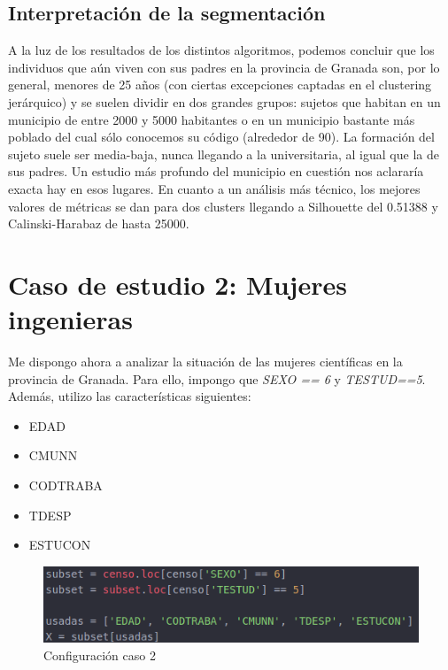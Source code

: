 \subsection{Interpretación de la segmentación}

A la luz de los resultados de los distintos algoritmos, podemos concluir que los individuos que aún viven con sus padres en la provincia de Granada son, por lo general, menores de 25 años (con ciertas excepciones captadas en el clustering jerárquico) y se suelen dividir en dos grandes grupos: sujetos que habitan en un municipio de entre 2000 y 5000 habitantes o en un municipio bastante más poblado del cual sólo conocemos su código (alrededor de 90). La formación del sujeto suele ser media-baja, nunca llegando a la universitaria, al igual que la de sus padres. Un estudio más profundo del municipio en cuestión nos aclararía exacta hay en esos lugares. En cuanto a un análisis más técnico, los mejores valores de métricas se dan para dos clusters llegando a Silhouette del 0.51388 y Calinski-Harabaz de hasta 25000.

\section{Caso de estudio 2: Mujeres ingenieras}

Me dispongo ahora a analizar la situación de las mujeres científicas en la provincia de Granada. Para ello, impongo que \textit{SEXO == 6} y \textit{TESTUD==5}. Además, utilizo las características siguientes:
\begin{itemize}
	\item EDAD
	\item CMUNN
	\item CODTRABA
	\item TDESP
	\item ESTUCON
\end{itemize}


\begin{figure}[H] %
	\centering
	\includegraphics[scale=0.7]{capt3.png}  %
	\caption{Configuración caso 2} 
	\label{fig:conf-caso2}
\end{figure}

